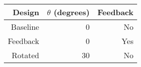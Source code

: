 \begin{tabular}{*{3}{r}}
    \toprule
    Design   & $\theta$ (degrees) & Feedback \\
    \midrule
    Baseline & 0                  & No       \\
    Feedback & 0                  & Yes      \\
    Rotated  & 30                 & No       \\
    \bottomrule
\end{tabular}
